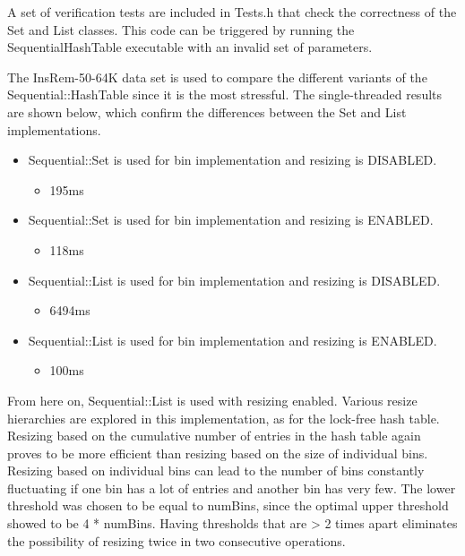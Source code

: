 \documentclass[11pt]{article} %
\begin{document}
A set of verification tests are included in Tests.h that check the correctness of the Set and List classes. This code can be triggered by running the SequentialHashTable executable with an invalid set of parameters.

The InsRem-50-64K data set is used to compare the different variants of the Sequential::HashTable since it is the most stressful. The single-threaded results are shown below, which confirm the differences between the Set and List implementations.

\begin{itemize}
	\item Sequential::Set is used for bin implementation and resizing is DISABLED.
	\begin{itemize}
    		\item 195ms
	\end{itemize}
	\item Sequential::Set is used for bin implementation and resizing is ENABLED.
	\begin{itemize}
		\item 118ms
	\end{itemize}
	\item Sequential::List is used for bin implementation and resizing is DISABLED.
	\begin{itemize}
		\item 6494ms
	\end{itemize}
	\item Sequential::List is used for bin implementation and resizing is ENABLED.
	\begin{itemize}
		\item 100ms
	\end{itemize}
\end{itemize}

From here on, Sequential::List is used with resizing enabled. Various resize hierarchies are explored in this implementation, as for the lock-free hash table. Resizing based on the cumulative number of entries in the hash table again proves to be more efficient than resizing based on the size of individual bins. Resizing based on individual bins can lead to the number of bins constantly fluctuating if one bin has a lot of entries and another bin has very few. The lower threshold was chosen to be equal to numBins, since the optimal upper threshold showed to be 4 * numBins. Having thresholds that are > 2 times apart eliminates the possibility of resizing twice in two consecutive operations.
\end{document}
